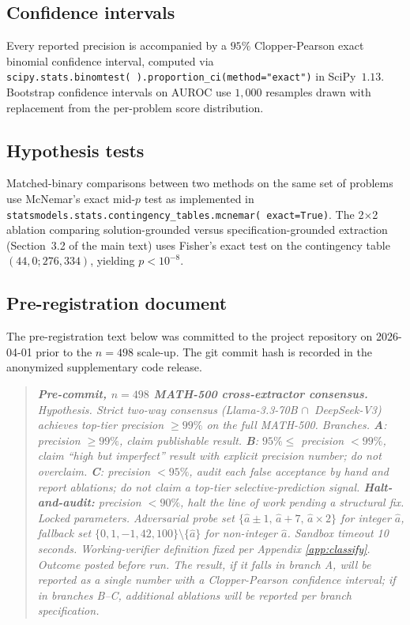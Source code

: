 \documentclass{article}
\begin{document}
\subsection{Confidence intervals}
Every reported precision is accompanied by a $95\%$
Clopper-Pearson exact binomial confidence interval, computed via
\texttt{scipy.stats.binomtest(\,).proportion\_ci(method="exact")} in
SciPy~$1.13$. Bootstrap confidence intervals on AUROC use $1{,}000$
resamples drawn with replacement from the per-problem score
distribution.

\subsection{Hypothesis tests}
Matched-binary comparisons between two methods on the same set of
problems use McNemar's exact mid-$p$
test\citep{fagerland2013mcnemar} as implemented in
\texttt{statsmodels.stats.contingency\_tables.mcnemar(\,exact=True)}.
The 2$\times$2 ablation comparing solution-grounded versus
specification-grounded extraction (Section~3.2 of the main text) uses
Fisher's exact test on the contingency table $(44, 0; 276, 334)$,
yielding $p < 10^{-8}$.

\subsection{Pre-registration document}
\label{app:prereg}
The pre-registration text below was committed to the project repository
on 2026-04-01 prior to the $n{=}498$ scale-up. The git commit hash is
recorded in the anonymized supplementary code release.

\begin{quote}\itshape\small
\textbf{Pre-commit, $n{=}498$ MATH-500 cross-extractor consensus.}
\textit{Hypothesis.} Strict two-way consensus (Llama-3.3-70B
$\cap$~DeepSeek-V3) achieves top-tier precision $\geq 99\%$ on the full
MATH-500.
\textit{Branches.} \textbf{A}: precision $\geq 99\%$, claim
publishable result. \textbf{B}: $95\% \leq$ precision $< 99\%$, claim
``high but imperfect'' result with explicit precision number; do not
overclaim. \textbf{C}: precision $< 95\%$, audit each false
acceptance by hand and report ablations; do not claim a top-tier
selective-prediction signal. \textbf{Halt-and-audit:} precision
$< 90\%$, halt the line of work pending a structural fix.
\textit{Locked parameters.} Adversarial probe set
$\{\hat a \pm 1,\, \hat a + 7,\, \hat a \times 2\}$ for integer $\hat a$,
fallback set $\{0, 1, -1, 42, 100\} \setminus \{\hat a\}$ for
non-integer $\hat a$. Sandbox timeout 10 seconds. Working-verifier
definition fixed per Appendix \ref{app:classify}. \textit{Outcome
posted before run.} The result, if it falls in branch A, will be
reported as a single number with a Clopper-Pearson confidence interval;
if in branches B--C, additional ablations will be reported per branch
specification.
\end{quote}
\end{document}

